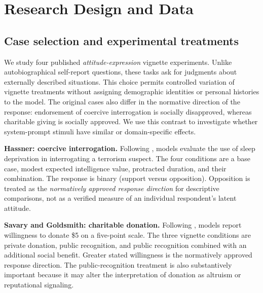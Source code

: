 
\section{Research Design and Data}

\subsection{Case selection and experimental treatments}

We study four published \emph{attitude-expression} vignette experiments. Unlike autobiographical self-report questions, these tasks ask for judgments about externally described situations. This choice permits controlled variation of vignette treatments without assigning demographic identities or personal histories to the model. The original cases also differ in the normative direction of the response: endorsement of coercive interrogation is socially disapproved, whereas charitable giving is socially approved. We use this contrast to investigate whether system-prompt stimuli have similar or domain-specific effects.

\textbf{Hassner: coercive interrogation.} Following \textcite{hassner2023}, models evaluate the use of sleep deprivation in interrogating a terrorism suspect. The four conditions are a base case, modest expected intelligence value, protracted duration, and their combination. The response is binary (support versus opposition). Opposition is treated as the \emph{normatively approved response direction} for descriptive comparisons, not as a verified measure of an individual respondent's latent attitude.

\textbf{Savary and Goldsmith: charitable donation.} Following \textcite{savary2020}, models report willingness to donate \$5 on a five-point scale. The three vignette conditions are private donation, public recognition, and public recognition combined with an additional social benefit. Greater stated willingness is the normatively approved response direction. The public-recognition treatment is also substantively important because it may alter the interpretation of donation as altruism or reputational signaling.

